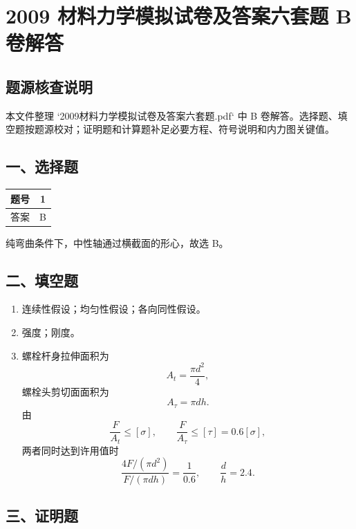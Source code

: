 \documentclass[11pt,a4paper]{ctexrep}
\newcommand{\assetdir}{}
\begin{document}
\chapter{2009 材料力学模拟试卷及答案六套题 B 卷解答}
{
\renewcommand{\assetdir}{../../考题_按知识点整理/visual_assets/question_crops/2009_2009材料力学模拟试卷及答案六套题}


\vspace{-1.0cm}

\section*{题源核查说明}

本文件整理 `2009材料力学模拟试卷及答案六套题.pdf` 中 B 卷解答。选择题、填空题按题源校对；证明题和计算题补足必要方程、符号说明和内力图关键值。

\section*{一、选择题}

\begin{center}
\begin{tabular}{c c}
\toprule
题号 & 1\\
\midrule
答案 & B\\
\bottomrule
\end{tabular}
\end{center}

纯弯曲条件下，中性轴通过横截面的形心，故选 B。

\section*{二、填空题}

\begin{enumerate}
    \item 连续性假设；均匀性假设；各向同性假设。
    \item 强度；刚度。
    \item 螺栓杆身拉伸面积为
    \[
        A_t=\frac{\pi d^2}{4},
    \]
    螺栓头剪切面面积为
    \[
        A_\tau=\pi d h.
    \]
    由
    \[
        \frac{F}{A_t}\le [\sigma],\qquad
        \frac{F}{A_\tau}\le [\tau]=0.6[\sigma],
    \]
    两者同时达到许用值时
    \[
        \frac{4F/(\pi d^2)}{F/(\pi d h)}
        =\frac{1}{0.6},
        \qquad
        \frac{d}{h}=2.4.
    \]
\end{enumerate}

\section*{三、证明题}

}
\end{document}
